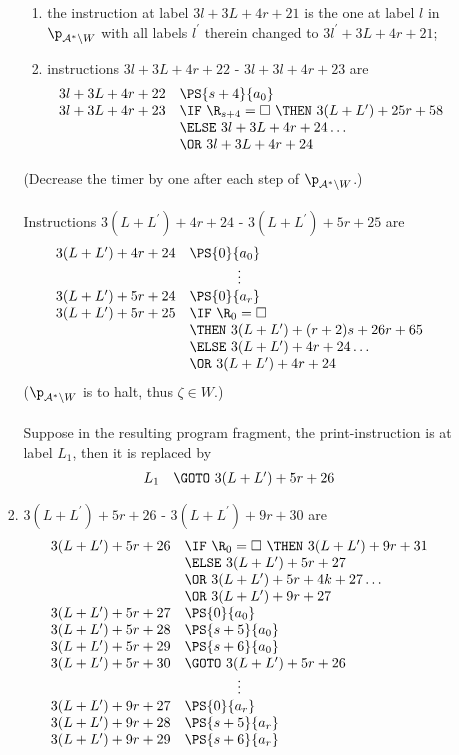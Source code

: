 \begin{enumerate}[1.]
\begin{enumerate}[(a)]
\begin{enumerate}[(1)]
\begin{enumerate}[1)]
\item the instruction at label $3l + 3L + 4r + 21$ is the one at label $l$ in $\p_{\mathcal{A}^\ast \setminus W}$ with all labels $l^\prime$ therein changed to $3l^\prime + 3L + 4r + 21$;
\item instructions $3l + 3L + 4r + 22$ - $3l + 3l + 4r + 23$ are
\[
\begin{array}{rl}
3l + 3L + 4r + 22 & \PS{s + 4}{a_0} \cr
3l + 3L + 4r + 23 & \IF \ \R_{s + 4} = \Box \ \THEN \ 3(L + L^\prime) + 25r + 58 \cr
\ & \ELSE \ 3l + 3L + 4r + 24 \ldots \cr
\ & \OR \ 3l + 3L + 4r + 24
\end{array}
\]
\end{enumerate}
(Decrease the timer by one after each step of $\p_{\mathcal{A}^\ast \setminus W}$.)\\
\ \\
Instructions $3(L + L^\prime) + 4r + 24$ - $3(L + L^\prime) + 5r + 25$ are
\[
\begin{array}{rl}
3(L + L^\prime) + 4r + 24 & \PS{0}{a_0} \cr
\multicolumn{2}{c}{\vdots} \cr
3(L + L^\prime) + 5r + 24 & \PS{0}{a_r} \cr
3(L + L^\prime) + 5r + 25 & \IF \ \R_0 = \Box \cr
\ & \THEN \ 3(L + L^\prime) + (r + 2)s + 26r + 65 \cr
\ & \ELSE \ 3(L + L^\prime) + 4r + 24 \ldots \cr
\ & \OR \ 3(L + L^\prime) + 4r + 24
\end{array}
\]
($\p_{\mathcal{A}^\ast \setminus W}$ is to halt, thus $\zeta \in W$.)\\
\ \\
Suppose in the resulting program fragment, the print-instruction is at label $L_1$, then it is replaced by
\[
\begin{array}{rl}
L_1 & \GOTO \ 3(L + L^\prime) + 5r + 26
\end{array}
\]
\item $3(L + L^\prime) + 5r + 26$ - $3(L + L^\prime) + 9r + 30$ are
\[
\begin{array}{rl}
3(L + L^\prime) + 5r + 26 & \IF \ \R_0 = \Box \ \THEN \ 3(L + L^\prime) + 9r + 31 \cr
\ & \ELSE \ 3(L + L^\prime) + 5r + 27 \cr
\ & \OR \ 3(L + L^\prime) + 5r + 4k + 27 \ldots \cr
\ & \OR \ 3(L + L^\prime) + 9r + 27 \cr
3(L + L^\prime) + 5r + 27 & \PS{0}{a_0} \cr
3(L + L^\prime) + 5r + 28 & \PS{s + 5}{a_0} \cr
3(L + L^\prime) + 5r + 29 & \PS{s + 6}{a_0} \cr
3(L + L^\prime) + 5r + 30 & \GOTO \ 3(L + L^\prime) + 5r + 26 \cr
\multicolumn{2}{c}{\vdots} \cr
3(L + L^\prime) + 9r + 27 & \PS{0}{a_r} \cr
3(L + L^\prime) + 9r + 28 & \PS{s + 5}{a_r} \cr
3(L + L^\prime) + 9r + 29 & \PS{s + 6}{a_r} \cr

\end{array}\]
\end{enumerate}
\end{enumerate}
\end{enumerate}
